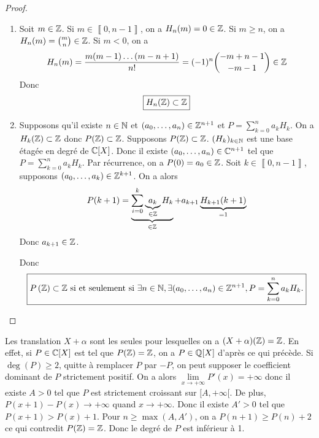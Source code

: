 \documentclass[12pt]{article}
\begin{document}
\begin{proof}
	\phantom{}
	\begin{enumerate}
		\item Soit $m\in\mathbb{Z}$. Si $m\in\left\llbracket 0,n-1\right\rrbracket$, on a $H_{n}(m)=0\in\mathbb{Z}$.
		Si $m\geqslant n$, on a $H_{n}(m)=\binom{m}{n}\in\mathbb{Z}$. Si $m<0$, on a 
		\begin{equation}
			H_{n}(m)=\frac{m(m-1)\dots(m-n+1)}{n!}=(-1)^{n}\binom{-m+n-1}{-m-1}\in\mathbb{Z}
		\end{equation}
		Donc 
		\begin{equation}
			\boxed{H_{n}(\mathbb{Z})\subset\mathbb{Z}}
		\end{equation}

		\item Supposons qu'il existe $n\in\mathbb{N}$ et $(a_{0},\dots,a_{n})\in\mathbb{Z}^{n+1}$ et $P=\sum_{k=0}^{n}a_{k}H_{k}$. On a $H_{k}(\mathbb{Z})\subset\mathbb{Z}$ donc $P(\mathbb{Z})\subset\mathbb{Z}$.
		Supposons $P(\mathbb{Z})\subset\mathbb{Z}$. $(H_{k})_{k\in\mathbb{N}}$ est une base étagée en degré de $\mathbb{C}[X]$. Donc il existe $(a_{0},\dots,a_{n})\in\mathbb{C}^{n+1}$ tel que $P=\sum_{k=0}^{n}a_{k}H_{k}$. Par récurrence, on a $P(0)=a_{0}\in\mathbb{Z}$. Soit $k\in\left\llbracket 0,n-1\right\rrbracket$, supposons $(a_{0},\dots,a_{k})\in\mathbb{Z}^{k+1}$. On a alors 
		\begin{equation}
			P(k+1)=\underbrace{\sum_{i=0}^{k}\underbrace{a_{k}}_{\in\mathbb{Z}}H_{k}}_{\in\mathbb{Z}}+a_{k+1}\underbrace{H_{k+1}(k+1)}_{=1}
		\end{equation}
		Donc $a_{k+1}\in\mathbb{Z}$.

		Donc 
		\begin{equation}
			\boxed{P\left(\mathbb{Z}\right)\subset\mathbb{Z}\text{ si et seulement si }\exists n\in\mathbb{N},\exists(a_{0},\dots,a_{n})\in\mathbb{Z}^{n+1},P=\sum_{k=0}^{n}a_{k}H_{k}.}
		\end{equation}
	\end{enumerate}
\end{proof}

\begin{remark}
	Les translation $X+\alpha$ sont les seules pour lesquelles on a $(X+\alpha)(\mathbb{Z})=\mathbb{Z}$. En effet, si $P\in\mathbb{C}[X]$ est tel que $P(\mathbb{Z})=\mathbb{Z}$, on a $P\in\mathbb{Q}[X]$ d'après ce qui précède. Si $\deg(P)\geqslant2$, quitte à remplacer $P$ par $-P$, on peut supposer le coefficient dominant de $P$ strictement positif. On a alors $\lim\limits_{x\to+\infty}P'(x)=+\infty$ donc il existe $A>0$ tel que $P$ est strictement croissant sur $[A,+\infty[$. De plus, $P(x+1)-P(x)\to+\infty$ quand $x\to+\infty$. Donc il existe $A'>0$ tel que $P(x+1)>P(x)+1$. Pour $n\geqslant\max(A,A')$, on a $P(n+1)\geqslant P(n)+2$ ce qui contredit $P(\mathbb{Z})=\mathbb{Z}$. Donc le degré de $P$ est inférieur à 1.
\end{remark}
\end{document}

